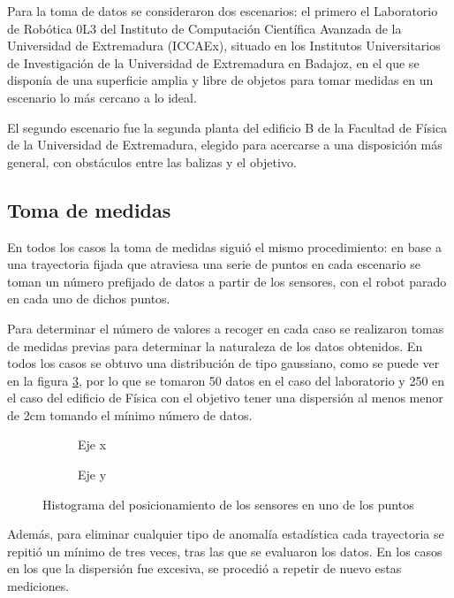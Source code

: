 Para la toma de datos se consideraron dos escenarios: el primero el Laboratorio de Robótica 0L3 del Instituto de Computación Científica Avanzada de la Universidad de Extremadura (ICCAEx), situado en los Institutos Universitarios de Investigación de la Universidad de Extremadura en Badajoz, en el que se disponía de una superficie amplia y libre de objetos para tomar medidas en un escenario lo más cercano a lo ideal.

El segundo escenario fue la segunda planta del edificio B de la Facultad de Física de la Universidad de Extremadura, elegido para acercarse a una disposición más general, con obstáculos entre las balizas y el objetivo.

\subsection{Toma de medidas}

En todos los casos la toma de medidas siguió el mismo procedimiento: en base a una trayectoria fijada que atraviesa una serie de puntos en cada escenario se toman un número prefijado de datos a partir de los sensores, con el robot parado en cada uno de dichos puntos.

Para determinar el número de valores a recoger en cada caso se realizaron tomas de medidas previas para determinar la naturaleza de los datos obtenidos.
En todos los casos se obtuvo una distribución de tipo gaussiano, como se puede ver en la figura \ref{fig:datos_sensor}, por lo que se tomaron 50 datos en el caso del laboratorio y 250 en el caso del edificio de Física con el objetivo tener una dispersión al menos menor de 2cm tomando el mínimo número de datos.

\begin{figure}[H]
  \begin{subfigure}[b]{.5\textwidth}
    \centering
     
    \caption{Eje x}
    \label{fig:hist_x}
  \end{subfigure}
  \begin{subfigure}[b]{.5\textwidth}
    \centering
    
    \caption{Eje y}
    \label{fig:hist_y}
  \end{subfigure}
  \caption{Histograma del posicionamiento de los sensores en uno de los puntos}
  \label{fig:datos_sensor}
\end{figure}

Además, para eliminar cualquier tipo de anomalía estadística cada trayectoria se repitió un mínimo de tres veces, tras las que se evaluaron los datos.
En los casos en los que la dispersión fue excesiva, se procedió a repetir de nuevo estas mediciones.

